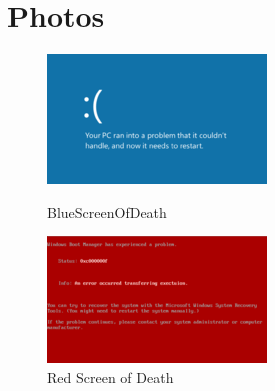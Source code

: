 \documentclass[paper=a4,fontsize=12pt,ngerman,parskip=half]{scrartcl}
\begin{document}
\section*{Photos}
\begin{figure}[!ht]
  \centering
  \begin{minipage}[b]{0.3\textwidth}
    \centering
    \includegraphics[width=\textwidth]{graphics/Pic/day 2/220px-Blue_Screen_of_Death.png}
    \caption{BlueScreenOfDeath}
    \label{fig:image}
  \end{minipage}
  \hfill
  \begin{minipage}[b]{0.3\textwidth}
    \centering
    \includegraphics[width=\textwidth]{graphics/Pic/day 2/220px-Red_Screen_of_Death.png}
    \caption{Red Screen of Death}
    \label{fig:image_two}
  \end{minipage}
  \vfill
  \begin{minipage}[b]{0.3\textwidth}
    \centering

\end{minipage}
\end{figure}
\end{document}
